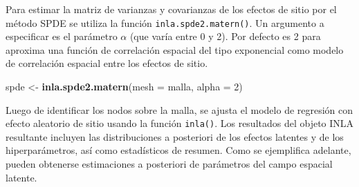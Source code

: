 \documentclass[11pt,b5paper,]{krantz}
\newenvironment{Shaded}{}{}
\newcommand{\DataTypeTok}[1]{\textcolor[rgb]{0.56,0.13,0.00}{#1}}
\newcommand{\DecValTok}[1]{\textcolor[rgb]{0.25,0.63,0.44}{#1}}
\newcommand{\KeywordTok}[1]{\textcolor[rgb]{0.00,0.44,0.13}{\textbf{#1}}}
\newcommand{\NormalTok}[1]{#1}
\newcommand{\OperatorTok}[1]{\textcolor[rgb]{0.40,0.40,0.40}{#1}}
\newcommand{\StringTok}[1]{\textcolor[rgb]{0.25,0.44,0.63}{#1}}
\begin{document}
\begin{Shaded}
\end{Shaded}

Para estimar la matriz de varianzas y covarianzas de los efectos de sitio por el método SPDE se utiliza la función \texttt{inla.spde2.matern()}. Un argumento a especificar es el parámetro \(\alpha\) (que varía entre 0 y 2). Por defecto es 2 para aproxima una función de correlación espacial del tipo exponencial como modelo de correlación espacial entre los efectos de sitio.

\begin{Shaded}
\begin{Highlighting}[]
\NormalTok{spde <-}\StringTok{ }\KeywordTok{inla.spde2.matern}\NormalTok{(}\DataTypeTok{mesh =}\NormalTok{ malla,}
                          \DataTypeTok{alpha =} \DecValTok{2}\NormalTok{)}
\end{Highlighting}
\end{Shaded}

Luego de identificar los nodos sobre la malla, se ajusta el modelo de regresión con efecto aleatorio de sitio usando la función \texttt{inla()}. Los resultados del objeto INLA resultante incluyen las distribuciones a posteriori de los efectos latentes y de los hiperparámetros, así como estadísticos de resumen. Como se ejemplifica adelante, pueden obtenerse estimaciones a posteriori de parámetros del campo espacial latente.
\end{document}
